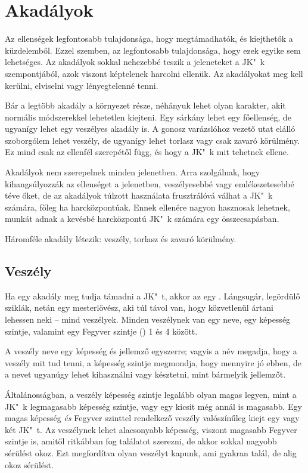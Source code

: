 \section{Akadályok}

Az ellenségek legfontosabb tulajdonsága, hogy megtámadhatók, és kiejthetők a küzdelemből. Ezzel szemben, az  legfontosabb tulajdonsága, hogy ezek egyike sem lehetséges. Az akadályok sokkal nehezebbé teszik a jeleneteket a JK"~k szempontjából, azok viszont képtelenek harcolni ellenük. Az akadályokat meg kell kerülni, elviselni vagy lényegtelenné tenni.

Bár a legtöbb akadály a környezet része, néhányuk lehet olyan karakter, akit normális módszerekkel lehetetlen kiejteni. Egy sárkány lehet egy főellenség, de ugyanígy lehet egy veszélyes akadály is. A gonosz varázslóhoz vezető utat elálló szoborgólem lehet veszély, de ugyanígy lehet torlasz vagy csak zavaró körülmény. Ez mind csak az ellenfél szerepétől függ, és hogy a JK"~k mit tehetnek ellene.

Akadályok nem szerepelnek minden jelenetben. Arra szolgálnak, hogy kihangsúlyozzák az ellenséget a jelenetben, veszélyesebbé vagy emlékezetesebbé téve őket, de az akadályok túlzott használata frusztrálóvá válhat a JK"~k számára, főleg ha harcközpontúak. Ennek ellenére nagyon hasznosak lehetnek, munkát adnak a kevésbé harcközpontú JK"~k számára egy összecsapásban.

Háromféle akadály létezik: veszély, torlasz és zavaró körülmény.

\subsection{Veszély}

Ha egy akadály meg tudja támadni a JK"~t, akkor az egy . Lángsugár, legördülő sziklák, netán egy mesterlövész, aki túl távol van, hogy közvetlenül ártani lehessen neki – mind veszélyek. Minden veszélynek van egy neve, egy képesség szintje, valamint egy Fegyver szintje () 1 és 4 között.

A veszély neve egy képesség és jellemző egyszerre; vagyis a név megadja, hogy a veszély mit tud tenni, a képesség szintje megmondja, hogy mennyire jó ebben, de a nevet ugyanúgy lehet kihasználni vagy késztetni, mint bármelyik jellemzőt.

Általánosságban, a veszély képesség szintje legalább olyan magas legyen, mint a JK"~k legmagasabb képesség szintje, vagy egy kicsit még annál is magasabb. Egy magas képesség \emph{és} Fegyver szinttel rendelkező veszély valószínűleg kiejt egy vagy két JK"~t. Az veszélynek lehet alacsonyabb képesség, viszont magasabb Fegyver szintje is, amitől ritkábban fog találatot szerezni, de akkor sokkal nagyobb sérülést okoz. Ezt megfordítva olyan veszélyt kapunk, ami gyakran talál, de alig okoz sérülést.

